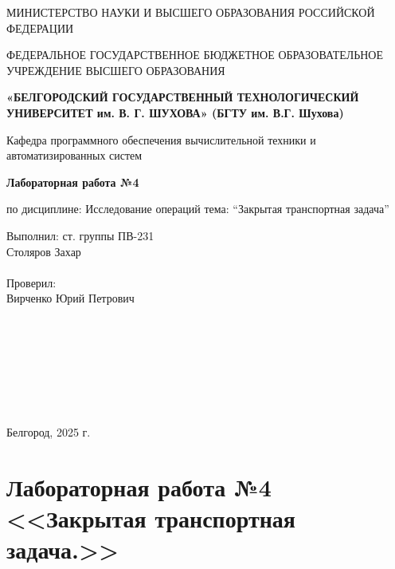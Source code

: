 \documentclass{report}
\newcommand{\q}[1]{``#1''}
\begin{document}
	\begin{titlepage}
		\begin{center}
			МИНИСТЕРСТВО НАУКИ И ВЫСШЕГО ОБРАЗОВАНИЯ\linebreak 
			РОССИЙСКОЙ ФЕДЕРАЦИИ\medskip
			
			ФЕДЕРАЛЬНОЕ ГОСУДАРСТВЕННОЕ БЮДЖЕТНОЕ ОБРАЗОВАТЕЛЬНОЕ 
			УЧРЕЖДЕНИЕ ВЫСШЕГО ОБРАЗОВАНИЯ\medskip
			
			\textbf{
				«БЕЛГОРОДСКИЙ ГОСУДАРСТВЕННЫЙ \linebreak
				ТЕХНОЛОГИЧЕСКИЙ УНИВЕРСИТЕТ им. В. Г. ШУХОВА»\linebreak
				(БГТУ им. В.Г. Шухова)
			}\bigskip
			
			Кафедра программного обеспечения вычислительной техники и автоматизированных систем
			\vspace{5cm}
			
			\Large\textbf{Лабораторная работа №4}
			
			\large по дисциплине: Исследование операций\linebreak
			тема: \q{Закрытая транспортная задача}
		\end{center}\vspace{6cm}
		
		\begin{flushright}
			\begin{minipage}{7cm}
				Выполнил: ст. группы ПВ-231\\
				Столяров Захар\\
				\\
				Проверил: \\
				Вирченко Юрий Петрович\\
			\end{minipage}
		\end{flushright}\bigskip
		
		\
		
		\
		
		\
		
		\
		
		
		\begin{center}
			Белгород, 2025 г.
		\end{center}
	\end{titlepage}
	
	\newpage
	
	\setcounter{secnumdepth}{-1}
	\chapter{Лабораторная работа №4 <<Закрытая транспортная задача.>>}
	
\end{document}
